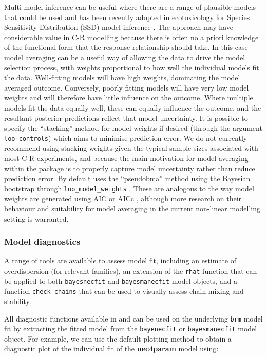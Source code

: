 \documentclass[
]{jss}
\begin{document}
Multi-model inference can be useful where there are a range of plausible
models that could be used \citep{Burnham2002} and has been recently
adopted in ecotoxicology for Species Sensitivity Distribution (SSD)
model inference \citep{Thorley2018, fox2020, Dalgarno}. The approach may
have considerable value in C-R modelling because there is often no a
priori knowledge of the functional form that the response relationship
should take. In this case model averaging can be a useful way of
allowing the data to drive the model selection process, with weights
proportional to how well the individual models fit the data.
Well-fitting models will have high weights, dominating the model
averaged outcome. Conversely, poorly fitting models will have very low
model weights and will therefore have little influence on the outcome.
Where multiple models fit the data equally well, these can equally
influence the outcome, and the resultant posterior predictions reflect
that model uncertainty. It is possible to specify the ``stacking''
method \citep{Yao2018} for model weights if desired (through the
argument \texttt{loo\_controls}) which aims to minimise prediction
error. We do not currently recommend using stacking weights given the
typical sample sizes associated with most C-R experiments, and because
the main motivation for model averaging within the 
package is to properly capture model uncertainty rather than reduce
prediction error. By default  uses the ``pseudobma''
method using the Bayesian bootstrap through \texttt{loo\_model\_weights}
\citep{vehtari2020, vehtari2017}. These are analogous to the way model
weights are generated using AIC or AICc \citep{Burnham2002}, although
more research on their behaviour and suitability for model averaging in
the current non-linear modelling setting is warranted.

\hypertarget{model-diagnostics}{%
\subsubsection{Model diagnostics}\label{model-diagnostics}}

A range of tools are available to assess model fit, including an
estimate of overdispersion (for relevant families), an extension of the
 \texttt{rhat} function that can be applied to both
\texttt{bayesnecfit} and \texttt{bayesmanecfit} model objects, and a
function \texttt{check\_chains} that can be used to visually assess
chain mixing and stability.

All diagnostic functions available in  and  can be
used on the underlying \texttt{brm} model fit by extracting the fitted
 model from the \texttt{bayenecfit} or \texttt{bayesmanecfit}
model object. For example, we can use the default  plotting
method to obtain a diagnostic plot of the individual fit of the
\textbf{nec4param} model using:
\end{document}
